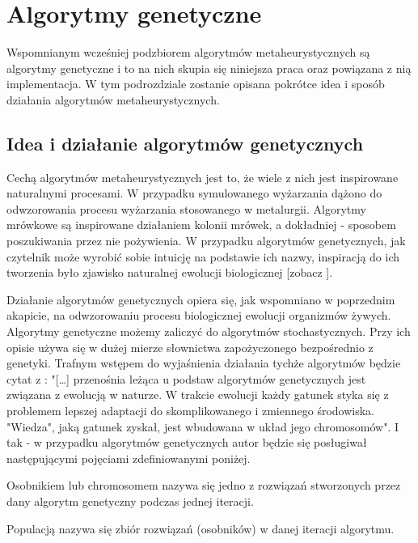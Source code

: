 \section{Algorytmy genetyczne}

Wspomnianym wcześniej podzbiorem algorytmów metaheurystycznych są algorytmy genetyczne i to na nich skupia się niniejsza praca oraz powiązana z nią implementacja. W tym podrozdziale zostanie opisana pokrótce idea i sposób działania algorytmów metaheurystycznych.

\subsection{Idea i działanie algorytmów genetycznych}

Cechą algorytmów metaheurystycznych jest to, że wiele z nich jest inspirowane naturalnymi procesami. W przypadku symulowanego wyżarzania dążono do odwzorowania procesu wyżarzania stosowanego w metalurgii. Algorytmy mrówkowe są inspirowane działaniem kolonii mrówek, a dokładniej - sposobem poszukiwania przez nie pożywienia. W przypadku algorytmów genetycznych, jak czytelnik może wyrobić sobie intuicję na podstawie ich nazwy, inspiracją do ich tworzenia było zjawisko naturalnej ewolucji biologicznej [zobacz \cite{AlgorytmyGenetyczne}].

Działanie algorytmów genetycznych opiera się, jak wspomniano w poprzednim akapicie, na odwzorowaniu procesu biologicznej ewolucji organizmów żywych. Algorytmy genetyczne możemy zaliczyć do algorytmów stochastycznych. Przy ich opisie używa się w dużej mierze słownictwa zapożyczonego bezpośrednio z genetyki. Trafnym wstępem do wyjaśnienia działania tychże algorytmów będzie cytat z \cite{GeneticAlgorithmsAndSimulatedAnnealing}: "[\ldots] przenośnia leżąca u podstaw algorytmów genetycznych jest związana z ewolucją w naturze. W trakcie ewolucji każdy gatunek styka się z problemem lepszej adaptacji do skomplikowanego i zmiennego środowiska. "Wiedza", jaką gatunek zyskał, jest wbudowana w układ jego chromosomów". I tak - w przypadku algorytmów genetycznych autor będzie się posługiwał następującymi pojęciami zdefiniowanymi poniżej.

\begin{definition}
Osobnikiem lub chromosomem nazywa się jedno z rozwiązań stworzonych przez dany algorytm genetyczny podczas jednej iteracji.
\end{definition}

\begin{definition}
Populacją nazywa się zbiór rozwiązań (osobników) w danej iteracji algorytmu.
\end{definition}


